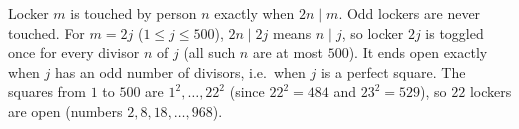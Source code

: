 Locker $m$ is touched by person $n$ exactly when $2n\mid m$. Odd lockers are never touched. For $m=2j$ ($1\le j\le500$), $2n\mid 2j$ means $n\mid j$, so locker $2j$ is toggled once for every divisor $n$ of $j$ (all such $n$ are at most $500$). It ends open exactly when $j$ has an odd number of divisors, i.e.\ when $j$ is a perfect square. The squares from $1$ to $500$ are $1^2,\dots,22^2$ (since $22^2=484$ and $23^2=529$), so $\boxed{22}$ lockers are open (numbers $2,8,18,\dots,968$).
